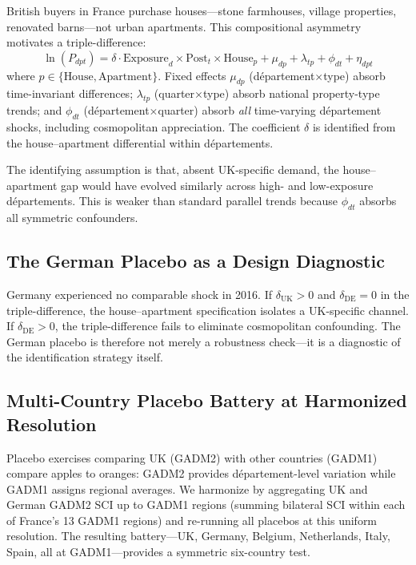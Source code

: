 \documentclass[12pt]{article}
\begin{document}
British buyers in France purchase houses---stone farmhouses, village properties, renovated barns---not urban apartments. This compositional asymmetry motivates a triple-difference:
\begin{equation}\label{eq:triple}
\ln(P_{dpt}) = \delta \cdot \text{Exposure}_d \times \text{Post}_t \times \text{House}_p + \mu_{dp} + \lambda_{tp} + \phi_{dt} + \eta_{dpt}
\end{equation}
where $p \in \{\text{House}, \text{Apartment}\}$. Fixed effects $\mu_{dp}$ (d\'epartement$\times$type) absorb time-invariant differences; $\lambda_{tp}$ (quarter$\times$type) absorb national property-type trends; and $\phi_{dt}$ (d\'epartement$\times$quarter) absorb \textit{all} time-varying d\'epartement shocks, including cosmopolitan appreciation. The coefficient $\delta$ is identified from the house--apartment differential within d\'epartements.

The identifying assumption is that, absent UK-specific demand, the house--apartment gap would have evolved similarly across high- and low-exposure d\'epartements. This is weaker than standard parallel trends because $\phi_{dt}$ absorbs all symmetric confounders.

\subsection{The German Placebo as a Design Diagnostic}

Germany experienced no comparable shock in 2016. If $\delta_{\text{UK}} > 0$ and $\delta_{\text{DE}} = 0$ in the triple-difference, the house--apartment specification isolates a UK-specific channel. If $\delta_{\text{DE}} > 0$, the triple-difference fails to eliminate cosmopolitan confounding. The German placebo is therefore not merely a robustness check---it is a diagnostic of the identification strategy itself.

\subsection{Multi-Country Placebo Battery at Harmonized Resolution}\label{subsec:gadm1}

Placebo exercises comparing UK (GADM2) with other countries (GADM1) compare apples to oranges: GADM2 provides d\'epartement-level variation while GADM1 assigns regional averages. We harmonize by aggregating UK and German GADM2 SCI up to GADM1 regions (summing bilateral SCI within each of France's 13 GADM1 regions) and re-running all placebos at this uniform resolution. The resulting battery---UK, Germany, Belgium, Netherlands, Italy, Spain, all at GADM1---provides a symmetric six-country test.
\end{document}
